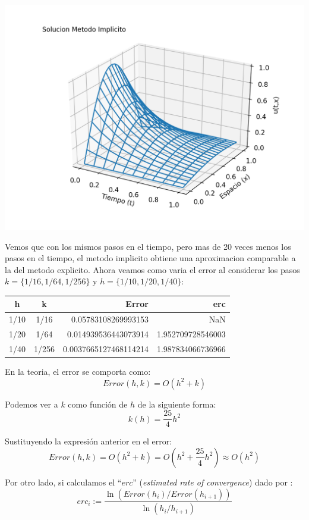 \documentclass[11pt]{article}
\makeatletter
\def\maxwidth{\ifdim\Gin@nat@width>\linewidth\linewidth
    \else\Gin@nat@width\fi}
\let\Oldincludegraphics\includegraphics
\renewcommand{\includegraphics}[1]{\Oldincludegraphics[width=.8\maxwidth]{#1}}
\theoremstyle{definition}
\makeatother
\begin{document}
    \begin{center}
    \includegraphics{fig2_2.png}
    \end{center}
    
    Vemos que con los mismos pasos en el tiempo, pero mas de 20 veces menos
los pasos en el tiempo, el metodo implicito obtiene una aproximacion
comparable a la del metodo explicito. Ahora veamos como varia el error
al considerar los pasos \(k = \{1/16, 1/64, 1/256\}\) y
\(h = \{ 1/10, 1/20, 1/40 \}\):

\begin{center} 
    \begin{tabular}{cc|rr} 
 \hline 
h & k & Error & erc \\ \hline 
1/10 & 1/16 & 0.05783108269993153 & NaN \\ 
1/20 & 1/64 & 0.014939536443073914 & 1.952709728546003 \\ 
1/40 & 1/256 & 0.0037665127468114214 & 1.987834066736966 \\ 
\hline 
 \end{tabular}
\end{center}
    En la teoria, el error se comporta como: \[Error(h,k)=O(h^2 + k)\]

    Podemos ver a \(k\) como función de \(h\) de la siguiente forma:
\[k(h)=\frac{25}{4}h^2\]

    Sustituyendo la expresión anterior en el error:
\[Error(h,k)=O(h^2+k)=O(h^2+\frac{25}{4}h^2)\approx O(h^2)\]

    Por otro lado, si calculamos el ``\(erc\)''
(\textit{estimated rate of convergence}) dado por :
\[erc_i:=\frac{\ln(Error(h_i)/Error(h_{i+1}))}{\ln(h_i/h_{i+1})}\]
\end{document}
